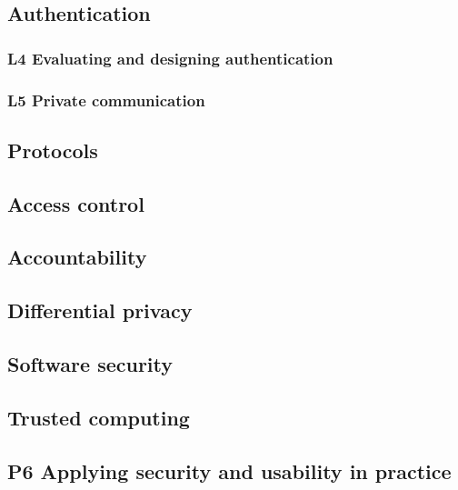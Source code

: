 {\subsection{Authentication}%
\label{authentication}


\subsubsection{L4 Evaluating and designing authentication}%
\label{pwdeval}


\subsubsection{L5 Private communication}%
\label{pricomlab}


\subsection{Protocols}%
\label{protocols}


\subsection{Access control}%
\label{ac}


\subsection{Accountability}%
\label{accountability}


\subsection{Differential privacy}%
\label{diffpriv}


\subsection{Software security}%
\label{software}


\subsection{Trusted computing}%
\label{trustcomp}


\subsection{P6 Applying security and usability in practice}%
\label{devel}

} %


